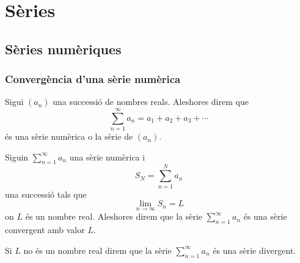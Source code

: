 \documentclass[../Apunts.tex]{subfiles}
\begin{document}
\chapter{Sèries}
	\section{Sèries numèriques}
	\subsection{Convergència d'una sèrie numèrica}
	\begin{definition}
		\label{def:sèrie numèrica}
		Sigui \((a_{n})\) una successió de nombres reals. Aleshores direm que
		\[\sum_{n=1}^{\infty}a_{n}=a_{1}+a_{2}+a_{3}+\cdots\]
		és una sèrie numèrica o la sèrie de \((a_{n})\).
	\end{definition}
	\begin{definition}
		\label{def:sèrie convergent}
		\label{def:sèrie divergent}
		Siguin \(\sum_{n=1}^{\infty}a_{n}\) una sèrie numèrica i
		\[S_{N}=\sum_{n=1}^{N}a_{n}\]
		una successió tals que
		\[\lim_{n\to\infty}S_{n}=L\]
		on \(L\) és un nombre real. Aleshores direm que la sèrie \(\sum_{n=1}^{\infty}a_{n}\) és una sèrie convergent amb valor \(L\).
		
		Si \(L\) no és un nombre real direm que la sèrie \(\sum_{n=1}^{\infty}a_{n}\) és una sèrie divergent.
	\end{definition}
\end{document}
